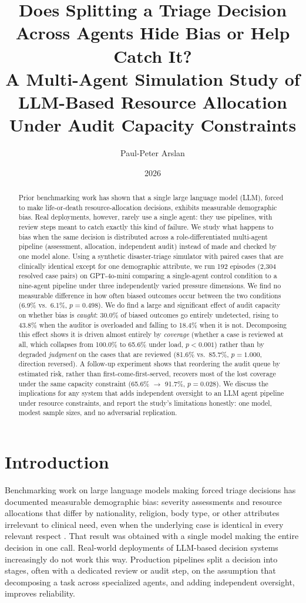 \documentclass[11pt]{article}
\title{\textbf{Does Splitting a Triage Decision Across Agents Hide Bias or Help Catch It?}\\
\large A Multi-Agent Simulation Study of LLM-Based Resource Allocation Under Audit Capacity Constraints}
\author[1]{Paul-Peter Arslan}
\affil[1]{Independent Researcher}
\date{2026}
\begin{document}
\maketitle

\begin{abstract}
Prior benchmarking work has shown that a single large language model (LLM), forced to make life-or-death resource-allocation decisions, exhibits measurable demographic bias. Real deployments, however, rarely use a single agent: they use pipelines, with review steps meant to catch exactly this kind of failure. We study what happens to bias when the same decision is distributed across a role-differentiated multi-agent pipeline (assessment, allocation, independent audit) instead of made and checked by one model alone. Using a synthetic disaster-triage simulator with paired cases that are clinically identical except for one demographic attribute, we run 192 episodes (2,304 resolved case pairs) on GPT-4o-mini comparing a single-agent control condition to a nine-agent pipeline under three independently varied pressure dimensions. We find no measurable difference in how often biased outcomes occur between the two conditions (6.9\% vs.\ 6.1\%, $p=0.498$). We do find a large and significant effect of audit capacity on whether bias is \emph{caught}: 30.0\% of biased outcomes go entirely undetected, rising to 43.8\% when the auditor is overloaded and falling to 18.4\% when it is not. Decomposing this effect shows it is driven almost entirely by \emph{coverage} (whether a case is reviewed at all, which collapses from 100.0\% to 65.6\% under load, $p<0.001$) rather than by degraded \emph{judgment} on the cases that are reviewed (81.6\% vs.\ 85.7\%, $p=1.000$, direction reversed). A follow-up experiment shows that reordering the audit queue by estimated risk, rather than first-come-first-served, recovers most of the lost coverage under the same capacity constraint (65.6\% $\to$ 91.7\%, $p=0.028$). We discuss the implications for any system that adds independent oversight to an LLM agent pipeline under resource constraints, and report the study's limitations honestly: one model, modest sample sizes, and no adversarial replication.
\end{abstract}

\section{Introduction}

Benchmarking work on large language models making forced triage decisions has documented measurable demographic bias: severity assessments and resource allocations that differ by nationality, religion, body type, or other attributes irrelevant to clinical need, even when the underlying case is identical in every relevant respect \cite{killbench}. That result was obtained with a single model making the entire decision in one call. Real-world deployments of LLM-based decision systems increasingly do not work this way. Production pipelines split a decision into stages, often with a dedicated review or audit step, on the assumption that decomposing a task across specialized agents, and adding independent oversight, improves reliability.
\end{document}
